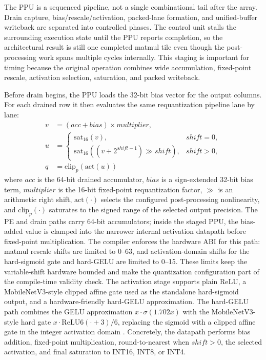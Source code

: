 \documentclass[a4paper, 12pt, titlepage]{article}
\begin{document}
The PPU is a sequenced pipeline, not a single combinational tail after the array. Drain capture, bias/rescale/activation, packed-lane formation, and unified-buffer writeback are separated into controlled phases. The control unit stalls the surrounding execution state until the PPU reports completion, so the architectural result is still one completed matmul tile even though the post-processing work spans multiple cycles internally. This staging is important for timing because the original operation combines wide accumulation, fixed-point rescale, activation selection, saturation, and packed writeback.

Before drain begins, the PPU loads the 32-bit bias vector for the output columns. For each drained row it then evaluates the same requantization pipeline lane by lane:
\[
\begin{aligned}
v &= (acc+bias)\times multiplier,\\
u &=
\begin{cases}
\mathrm{sat}_{16}(v), & shift = 0,\\
\mathrm{sat}_{16}\left((v + 2^{shift-1}) \gg shift\right), & shift > 0,
\end{cases}
\\
q &= \mathrm{clip}_{p}\left(\mathrm{act}(u)\right)
\end{aligned}
\]
where \(acc\) is the 64-bit drained accumulator, \(bias\) is a sign-extended 32-bit bias term, \(multiplier\) is the 16-bit fixed-point requantization factor, \(\gg\) is an arithmetic right shift, \(\mathrm{act}(\cdot)\) selects the configured post-processing nonlinearity, and \(\mathrm{clip}_{p}(\cdot)\) saturates to the signed range of the selected output precision. The PE and drain paths carry 64-bit accumulators; inside the staged PPU, the bias-added value is clamped into the narrower internal activation datapath before fixed-point multiplication. The compiler enforces the hardware ABI for this path: matmul rescale shifts are limited to 0--63, and activation-domain shifts for the hard-sigmoid gate and hard-GELU are limited to 0--15. These limits keep the variable-shift hardware bounded and make the quantization configuration part of the compile-time validity check. The activation stage supports plain ReLU, a MobileNetV3-style clipped affine gate used as the standalone hard-sigmoid output, and a hardware-friendly hard-GELU approximation. The hard-GELU path combines the GELU approximation \(x\cdot\sigma(1.702x)\) with the MobileNetV3-style hard gate \(x\cdot\mathrm{ReLU6}(\cdot+3)/6\), replacing the sigmoid with a clipped affine gate in the integer activation domain \cite{hendrycks2016gelu,howard2019mobilenetv3,kim2021ibert}. Concretely, the datapath performs bias addition, fixed-point multiplication, round-to-nearest when \(shift > 0\), the selected activation, and final saturation to INT16, INT8, or INT4.
\end{document}
